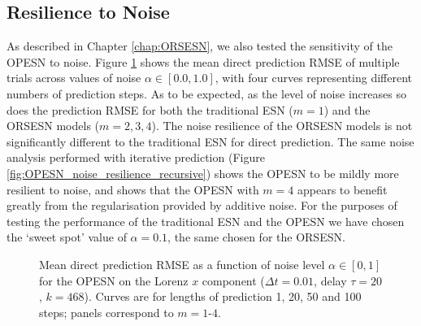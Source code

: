 \subsection{Resilience to Noise}

As described in Chapter \ref{chap:ORSESN}, we also tested the sensitivity of the OPESN to noise. Figure \ref{fig:OPESN_noise_resilience_direct} shows the mean direct prediction RMSE of multiple trials across values of noise $\alpha\in[0.0, 1.0]$, with four curves representing different numbers of prediction steps. As to be expected, as the level of noise increases so does the prediction RMSE for both the traditional ESN ($m=1$) and the ORSESN models ($m=2,3,4$). The noise resilience of the ORSESN models is not significantly different to the traditional ESN for direct prediction. The same noise analysis performed with iterative prediction (Figure \ref{fig:OPESN_noise_resilience_recursive}) shows the OPESN to be mildly more resilient to noise, and shows that the OPESN with $m=4$ appears to benefit greatly from the regularisation provided by additive noise. For the purposes of testing the performance of the traditional ESN and the OPESN we have chosen the `sweet spot' value of $\alpha = 0.1$, the same chosen for the ORSESN.

\begin{figure}
    \centering
    \caption{Mean direct prediction RMSE as a function of noise level $\alpha\in[0,1]$ for the OPESN on the Lorenz $x$ component ($\Delta t=0.01$, delay $\tau=20$, $k=468$). Curves are for lengths of prediction 1, 20, 50 and 100 steps; panels correspond to $m=1$-$4$.}
    \label{fig:OPESN_noise_resilience_direct}
\end{figure}

